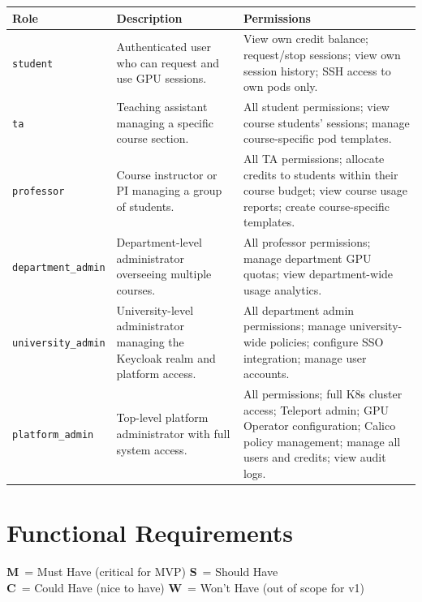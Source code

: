 \documentclass[12pt,a4paper]{article}
\newcommand{\Must}{\textcolor{dangered}{\textbf{M}}}
\newcommand{\Should}{\textcolor{warningyellow}{\textbf{S}}}
\newcommand{\Could}{\textcolor{successgreen}{\textbf{C}}}
\newcommand{\Wont}{\textcolor{hoppergray}{\textbf{W}}}
\begin{document}
\begin{tabularx}{\textwidth}{@{}L{3.5cm}L{5cm}X@{}}
  
  \textbf{Role} & \textbf{Description} & \textbf{Permissions} \\
  \midrule
   \texttt{student}
    & Authenticated user who can request and use GPU sessions.
    & View own credit balance; request/stop sessions; view own session history; SSH access to own pods only. \\
  \texttt{ta}
    & Teaching assistant managing a specific course section.
    & All student permissions; view course students' sessions; manage course-specific pod templates. \\
   \texttt{professor}
    & Course instructor or PI managing a group of students.
    & All TA permissions; allocate credits to students within their course budget; view course usage reports; create course-specific templates. \\
  \texttt{department\_admin}
    & Department-level administrator overseeing multiple courses.
    & All professor permissions; manage department GPU quotas; view department-wide usage analytics. \\
   \texttt{university\_admin}
    & University-level administrator managing the Keycloak realm and platform access.
    & All department admin permissions; manage university-wide policies; configure SSO integration; manage user accounts. \\
  \texttt{platform\_admin}
    & Top-level platform administrator with full system access.
    & All permissions; full K8s cluster access; Teleport admin; GPU Operator configuration; Calico policy management; manage all users and credits; view audit logs. \\
  
\end{tabularx}

\newpage
\section{Functional Requirements}

\begin{notebox}
  \Must\ = Must Have (critical for MVP) \quad
  \Should\ = Should Have \quad \\
  \Could\ = Could Have (nice to have) \quad
  \Wont\ = Won't Have (out of scope for v1)
\end{notebox}
\end{document}
